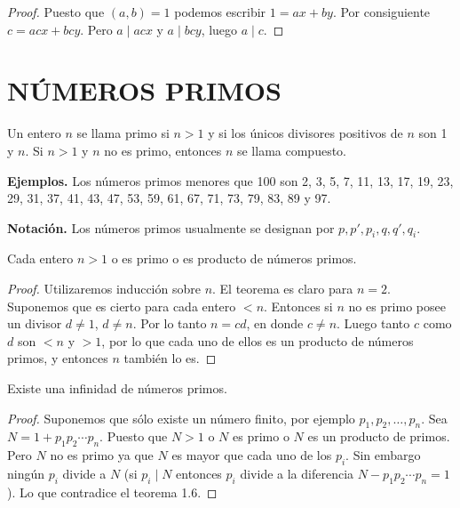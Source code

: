 \documentclass[12pt,a4paper]{book}
\begin{document}
    \begin{proof}
        Puesto que $(a,b)=1$ podemos escribir $1=ax+by$. Por consiguiente $c=acx+bcy$. Pero
        $a\mid acx$ y $a\mid bcy$, luego $a\mid c$.
    \end{proof}

    \section{NÚMEROS PRIMOS}

    \begin{definicion}
        Un entero $n$ se llama primo si $n>1$ y si los únicos divisores positivos de $n$ son
        1 y $n$. Si $n>1$ y $n$ no es primo, entonces $n$ se llama compuesto.
    \end{definicion}

    \textbf{Ejemplos.} Los números primos menores que 100 son 2, 3, 5, 7, 11, 13, 17, 19, 23,
    29, 31, 37, 41, 43, 47, 53, 59, 61, 67, 71, 73, 79, 83, 89 y 97.

    \textbf{Notación.} Los números primos usualmente se designan por $p,p',p_i,q,q',q_i$.

    \begin{teorema}
        Cada entero $n>1$ o es primo o es producto de números primos.
    \end{teorema}

    \begin{proof}
        Utilizaremos inducción sobre $n$. El teorema es claro para $n=2$. Suponemos que es
        cierto para cada entero $<n$. Entonces si $n$ no es primo posee un divisor $d\neq1$,
        $d\neq n$. Por lo tanto $n=cd$, en donde $c\neq n$. Luego tanto $c$ como $d$ son $<n$
        y $>1$, por lo que cada uno de ellos es un producto de números primos, y entonces $n$
        también lo es.
    \end{proof}

    \begin{teorema}[Euclides]
        Existe una infinidad de números primos.
    \end{teorema}

    \begin{proof}
        Suponemos que sólo existe un número finito, por ejemplo $p_1,p_2,\dots,p_n$. Sea
        $N=1+p_1p_2\cdots p_n$. Puesto que $N>1$ o $N$ es primo o $N$ es un producto de
        primos. Pero $N$ no es primo ya que $N$ es mayor que cada uno de los $p_i$. Sin
        embargo ningún $p_i$ divide a $N$ (si $p_i\mid N$ entonces $p_i$ divide a la
        diferencia $N-p_1p_2\cdots p_n=1$). Lo que contradice el teorema 1.6.
    \end{proof}
\end{document}
